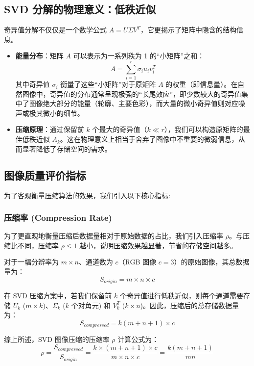 	\subsection{SVD 分解的物理意义：低秩近似}
	奇异值分解不仅仅是一个数学公式 $A = U \Sigma V^T$，它更揭示了矩阵中隐含的结构信息。
	\begin{itemize}
		\item \textbf{能量分布}：矩阵 $A$ 可以表示为一系列秩为 1 的“小矩阵”之和：
		\begin{equation*}
			A = \sum_{i=1}^{r} \sigma_i u_i v_i^T
		\end{equation*}
		其中奇异值 $\sigma_i$ 衡量了这些“小矩阵”对于原矩阵 $A$ 的权重（即信息量）。在自然图像中，奇异值的分布通常呈现极强的“长尾效应”，即少数较大的奇异值集中了图像绝大部分的能量（轮廓、主要色彩），而大量的微小奇异值则对应噪声或极其微小的细节。
		\item \textbf{压缩原理}：通过保留前 $k$ 个最大的奇异值（$k \ll r$），我们可以构造原矩阵的最佳低秩近似 $A_k$。这在物理意义上相当于舍弃了图像中不重要的微弱信息，从而显著降低了存储空间的需求。
	\end{itemize}
	
	\subsection{图像质量评价指标}
	为了客观衡量压缩算法的效果，我们引入以下核心指标:
		
	\subsubsection{压缩率 (Compression Rate)}
	为了更直观地衡量压缩后数据量相对于原始数据的占比，我们引入压缩率 $\rho$。与压缩比不同，压缩率 $\rho \le 1$ 越小，说明压缩效果越显著，节省的存储空间越多。
	
	对于一幅分辨率为 $m \times n$、通道数为 $c$（RGB 图像 $c=3$）的原始图像，其总数据量为：
	\begin{equation*}
		S_{origin} = m \times n \times c
	\end{equation*}
	
	在 SVD 压缩方案中，若我们保留前 $k$ 个奇异值进行低秩近似，则每个通道需要存储 $U_k$ ($m \times k$)、$\Sigma_k$ ($k$ 个对角元) 和 $V_k^T$ ($k \times n$)。因此，压缩后的总存储数据量为：
	\begin{equation*}
		S_{compressed} = k(m + n + 1) \times c
	\end{equation*}
	
	综上所述，SVD 图像压缩的压缩率 $\rho$ 计算公式为：
	\begin{equation*}
		\rho = \frac{S_{compressed}}{S_{origin}} = \frac{k \times (m + n + 1) \times c}{m \times n \times c} = \frac{k(m + n + 1)}{mn}
	\end{equation*}
	
